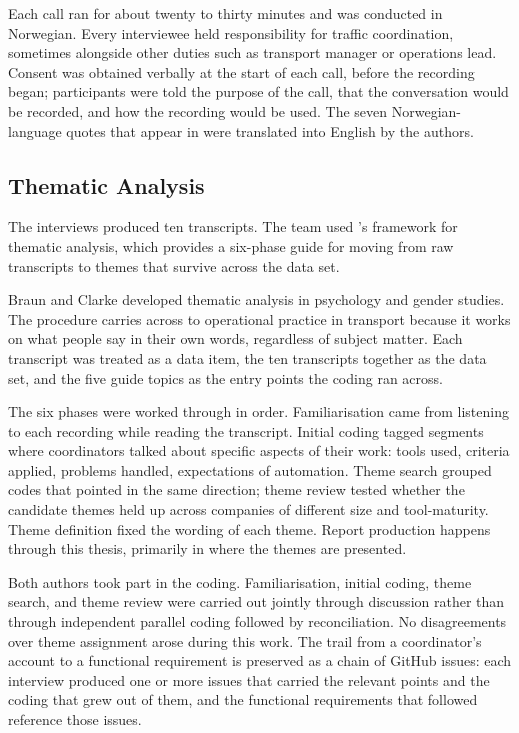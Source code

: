 Each call ran for about twenty to thirty minutes and was conducted in Norwegian. Every interviewee held responsibility for traffic coordination, sometimes alongside other duties such as transport manager or operations lead. Consent was obtained verbally at the start of each call, before the recording began; participants were told the purpose of the call, that the conversation would be recorded, and how the recording would be used. The seven Norwegian-language quotes that appear in  were translated into English by the authors.

\subsection{Thematic Analysis}
\label{sec:thematic-analysis}

The interviews produced ten transcripts. The team used \textcite{braun2006thematic}'s framework for thematic analysis, which provides a six-phase guide for moving from raw transcripts to themes that survive across the data set.

Braun and Clarke developed thematic analysis in psychology and gender studies. The procedure carries across to operational practice in transport because it works on what people say in their own words, regardless of subject matter. Each transcript was treated as a data item, the ten transcripts together as the data set, and the five guide topics as the entry points the coding ran across.

The six phases were worked through in order. Familiarisation came from listening to each recording while reading the transcript. Initial coding tagged segments where coordinators talked about specific aspects of their work: tools used, criteria applied, problems handled, expectations of automation. Theme search grouped codes that pointed in the same direction; theme review tested whether the candidate themes held up across companies of different size and tool-maturity. Theme definition fixed the wording of each theme. Report production happens through this thesis, primarily in  where the themes are presented.

Both authors took part in the coding. Familiarisation, initial coding, theme search, and theme review were carried out jointly through discussion rather than through independent parallel coding followed by reconciliation. No disagreements over theme assignment arose during this work. The trail from a coordinator's account to a functional requirement is preserved as a chain of GitHub issues: each interview produced one or more issues that carried the relevant points and the coding that grew out of them, and the functional requirements that followed reference those issues.

